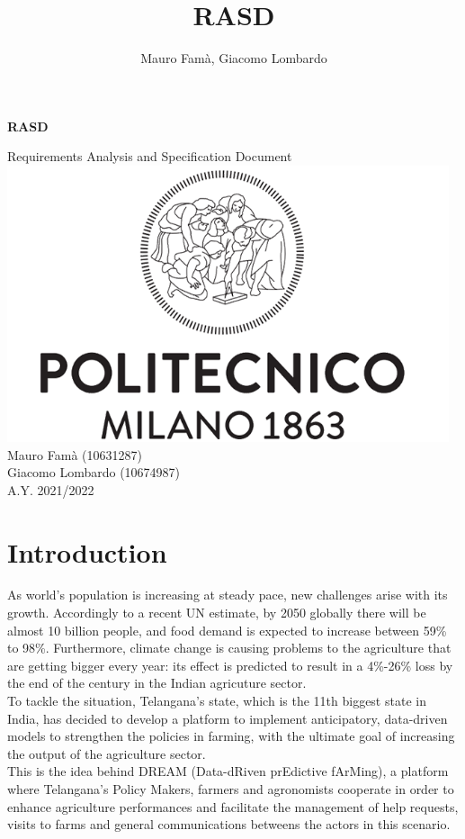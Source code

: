 \documentclass[10pt]{article}
\title{RASD}
\author{Mauro Famà, Giacomo Lombardo}
\begin{document}
\thispagestyle{empty}
\begin{titlepage}
    \begin{center}
       {\Huge \textbf{RASD}} %
       \vspace{0.5cm}
       \\
    \begin{LARGE}
        {Requirements Analysis and Specification Document}
        \vspace{1.0cm}
        \\
        \includegraphics[width=13cm]{polimi.png}
        \vspace{1.5cm}\\
        Mauro Famà (10631287)\\Giacomo Lombardo (10674987)
        \vspace{1.5cm}\\
        {A.Y. 2021/2022}
    \end{LARGE}  
   \end{center}
\end{titlepage}
\newpage
\tableofcontents %
\newpage
\section{Introduction}
As world's population is increasing at steady pace, new challenges arise with its growth.
Accordingly to a recent UN estimate, by 2050 globally there will be almost 10 billion people, 
and food demand is expected to increase between 59\% to 98\%. Furthermore, climate change is causing 
problems to the agriculture that are getting bigger every year: its effect is predicted to result in a 
4\%-26\% loss by the end of the century in the Indian agricuture sector.\\
To tackle the situation, Telangana's state, which is the 11th biggest state in India, has decided to develop a 
platform to implement anticipatory, data-driven models to strengthen the policies in farming, with the ultimate
goal of increasing the output of the agriculture sector.\\
This is the idea behind DREAM (Data-dRiven prEdictive fArMing), a platform where Telangana's
Policy Makers, farmers and agronomists cooperate in order to enhance agriculture performances and facilitate the 
management of help requests, visits to farms and general communications betweens the actors in this scenario.
\end{document}
